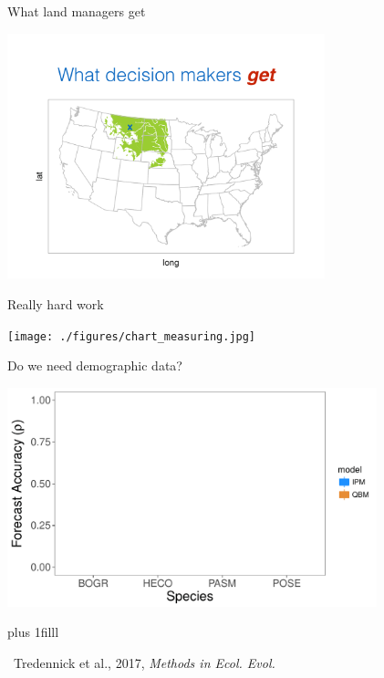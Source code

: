 \documentclass[12pt, compress, aspectratio=1610]{beamer}
\newcommand{\btVFill}{\vskip0pt plus 1filll}
\newcommand{\credit}[1]{\btVFill\par\hfill \footnotesize ~#1}
\let\OldTexttt\texttt
\renewcommand{\texttt}[1]{\OldTexttt{\color{codecolor}#1}}
\begin{document}
\begin{frame}{%
\protect\hypertarget{what-land-managers-get}{%
What land managers get}}

\centering

\includegraphics[height=2.8in]{./figures/managers_get.pdf}

\end{frame}

\begin{frame}{%
\protect\hypertarget{really-hard-work}{%
Really hard work}}

\texttt{[image: ./figures/chart\_measuring.jpg]}

\end{frame}

\begin{frame}{%
\protect\hypertarget{do-we-need-demographic-data}{%
Do we need demographic data?}}

\centering

\includegraphics[height=2.5in]{./figures/mee_forecast_accuracy_empty.pdf}

\credit{Tredennick et al., 2017, \emph{Methods in Ecol. Evol.}}

\end{frame}
\end{document}
